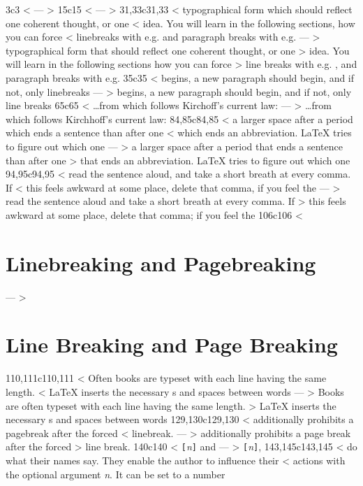 3c3
< %
---
> %
15c15
< 
---
> 
31,33c31,33
< typographical form which should reflect one coherent thought, or one
< idea.  You will learn in the following sections, how you can force
< linebreaks with e.g.{} \texttt{\bs\bs} and paragraph breaks with e.g.{} 
---
> typographical form that should reflect one coherent thought, or one
> idea.  You will learn in the following sections how you can force
> line breaks with e.g.{} \texttt{\bs\bs}, and paragraph breaks with e.g.{} 
35c35
< begins, a new paragraph should begin, and if not, only linebreaks
---
> begins, a new paragraph should begin, and if not, only line breaks
65c65
< \ldots from which follows Kirchoff's current law:
---
> \ldots from which follows Kirchhoff's current law:
84,85c84,85
< a larger space after a period which ends a sentence than after one
< which ends an abbreviation.  \LaTeX{} tries to figure out which one
---
> a larger space after a period that ends a sentence than after one
> that ends an abbreviation.  \LaTeX{} tries to figure out which one
94,95c94,95
< read the sentence aloud, and take a short breath at every comma.  If
< this feels awkward at some place, delete that comma, if you feel the
---
> read the sentence aloud and take a short breath at every comma.  If
> this feels awkward at some place, delete that comma; if you feel the
106c106
< \section{Linebreaking and Pagebreaking}
---
> \section{Line Breaking and Page Breaking}
110,111c110,111
< Often books are typeset with each line having the same length.
< \LaTeX{} inserts the necessary s and spaces between words
---
> Books are often typeset with each line having the same length.
> \LaTeX{} inserts the necessary s and spaces between words
129,130c129,130
< \noindent additionally prohibits a pagebreak after the forced
< linebreak. 
---
> \noindent additionally prohibits a page break after the forced
> line break. 
140c140
< \verb|[|\emph{n}\verb|]| and
---
> \verb|[|\emph{n}\verb|]|,
143,145c143,145
< \noindent do what their names say. They enable the author to influence their
< actions with the optional argument \emph{n}. It can be set to a number
